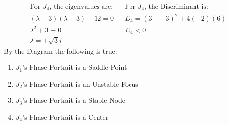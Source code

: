 \documentclass[12pt]{article}
\begin{document}
	\begin{align*}
		\text{For $J_4$, the eigenvalues are:} && \text{For $J_4$, the Discriminant is:}  \\
		(\lambda - 3)(\lambda + 3) + 12 = 0  && D_4 = (3 - -3)^2 + 4(-2)(6) \\
		\lambda^2 + 3 = 0 && D_4 < 0 \\
		\lambda = \pm \sqrt{3}i
	\end{align*}
By the Diagram the following is true:
	\begin{enumerate}
		\item $J_1$'s Phase Portrait is a Saddle Point 
		\item $J_2$'s Phase Portrait is an Unstable Focus 
		\item $J_3$'s Phase Portrait is a Stable Node 
		\item $J_4$'s Phase Portrait is a Center 
	\end{enumerate}
\end{document}
